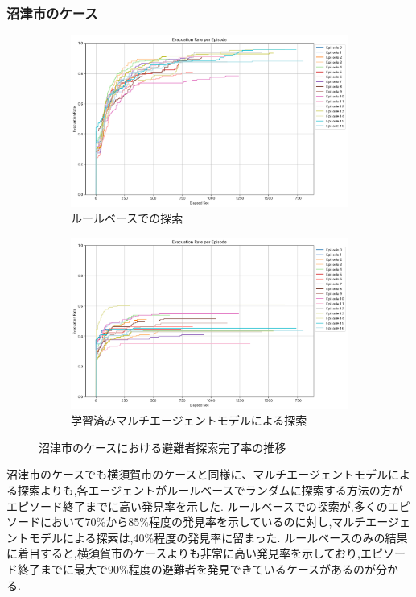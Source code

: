\subsubsection{沼津市のケース}
\begin{figure}[H]
  \centering
  \begin{subfigure}{0.45\textwidth}
      \centering
      \includegraphics[width=\textwidth]{Figures/NumazuSearch-RuleResult.png}
      \caption{ルールベースでの探索}
      \label{fig:NumazuSearch-RuleResult}
  \end{subfigure}
  \begin{subfigure}{0.45\textwidth}
      \centering
      \includegraphics[width=\textwidth]{Figures/NumazuSearch-AgentsResult.png}
      \caption{学習済みマルチエージェントモデルによる探索}
      \label{fig:NumazuModel-Result2}
  \end{subfigure}
  \caption{沼津市のケースにおける避難者探索完了率の推移}
  \label{fig:Model-Result-Errors}
\end{figure}
沼津市のケースでも横須賀市のケースと同様に、マルチエージェントモデルによる探索よりも,各エージェントがルールベースでランダムに探索する方法の方がエピソード終了までに高い発見率を示した.
ルールベースでの探索が,多くのエピソードにおいて70\%から85\%程度の発見率を示しているのに対し,マルチエージェントモデルによる探索は,40\%程度の発見率に留まった.
ルールベースのみの結果に着目すると,横須賀市のケースよりも非常に高い発見率を示しており,エピソード終了までに最大で90\%程度の避難者を発見できているケースがあるのが分かる.

